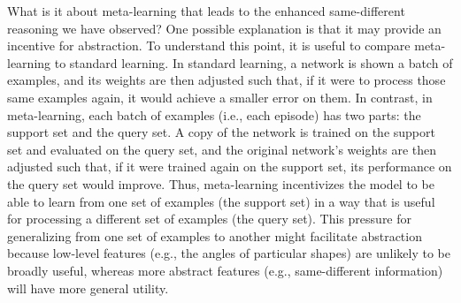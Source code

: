 \documentclass[10pt,letterpaper]{article}
\begin{document}
What is it about meta-learning that leads to the enhanced same-different reasoning we have observed? One possible explanation is that it may provide an incentive for abstraction. To understand this point, it is useful to compare meta-learning to standard learning. In standard learning, a network is shown a batch of examples, and its weights are then adjusted such that, if it were to process those same examples again, it would achieve a smaller error on them. 
In contrast, in meta-learning, each batch of examples (i.e., each episode) has two parts: the support set and the query set. A copy of the network is trained on the support set and evaluated on the query set, and the original network's weights are then adjusted such that, if it were trained again on the support set, its performance on the query set would improve.
Thus, meta-learning incentivizes the model to be able to learn from one set of examples (the support set) in a way that is useful for processing a different set of examples (the query set).
This pressure for generalizing from one set of examples to another might facilitate abstraction because low-level features (e.g., the angles of particular shapes) are unlikely to be broadly useful, whereas more abstract features (e.g., same-different information) will have more general utility.
\end{document}
